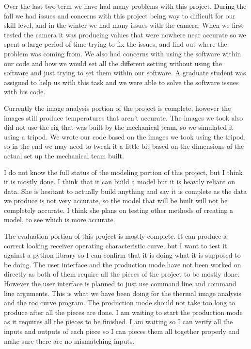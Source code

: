 \documentclass[onecolumn, draftclsnofoot,10pt, compsoc]{IEEEtran}
\begin{document}
Over the last two term we have had many problems with this project. During the fall we had issues and concerns with this project being way to difficult for our skill level, and in the winter we had many issues with the camera. When we first tested the camera it was producing values that were nowhere near accurate so we spent a large period of time trying to fix the issues, and find out where the problem was coming from. We also had concerns with using the software within our code and how we would set all the different setting without using the software and just trying to set them within our software. A graduate student was assigned to help us with this task and we were able to solve the software issues with his code.

Currently the image analysis portion of the project is complete, however the images still produce temperatures that aren’t accurate. The images we took also did not use the rig that was built by the mechanical team, so we simulated it using a tripod. We wrote our code based on the images we took using the tripod, so in the end we may need to tweak it a little bit based on the dimensions of the actual set up the mechanical team built.

I do not know the full status of the modeling portion of this project, but I think it is mostly done. I think that it can build a model but it is heavily reliant on data. She is hesitant to actually build anything and say it is complete as the data we produce is not very accurate, so the model that will be built will not be completely accurate. I think she plans on testing other methods of creating a model, to see which is more accurate.

The evaluation portion of this project is mostly complete. It can produce a correct looking receiver operating characteristic curve, but I want to test it against a python library so I can confirm that it is doing what it is supposed to be doing. The user interface and the production mode have not been worked on directly as both of them require all the pieces of the project to be mostly done. However the user interface is planned to just use command line and command line arguments. This is what we have been doing for the thermal image analysis and the roc curve program. The production mode should not take too long to produce after all the pieces are done. I am waiting to start the production mode as it requires all the pieces to be finished. I am waiting so I can verify all the inputs and outputs of each piece so I can pieces them all together properly and make sure there are no mismatching inputs.
\end{document}
